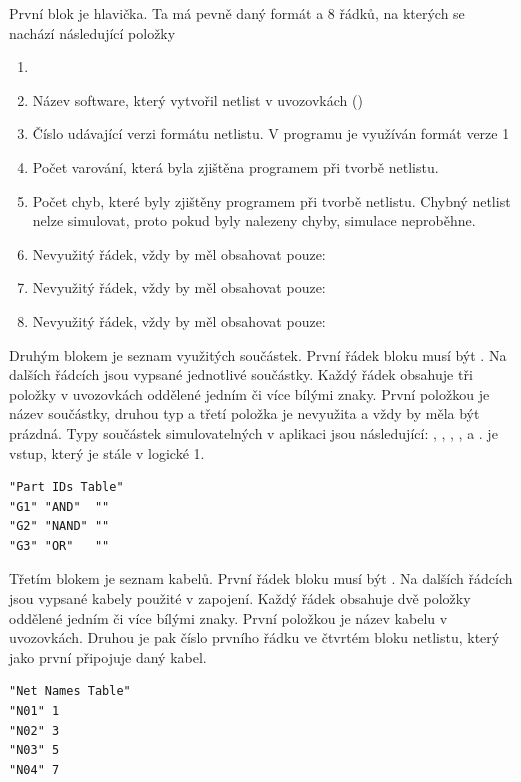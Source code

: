 \documentclass[11pt,a4paper]{article}
\begin{document}
			První blok je hlavička. Ta má pevně daný formát a 8 řádků, na kterých se nachází následující položky

			\begin{enumerate}
				\item {}
				\item Název software, který vytvořil netlist v uvozovkách ()
				\item Číslo udávající verzi formátu netlistu. V programu je využíván formát verze 1
				\item Počet varování, která byla zjištěna programem při tvorbě netlistu.
				\item Počet chyb, které byly zjištěny programem při tvorbě netlistu. Chybný netlist nelze simulovat, proto pokud byly nalezeny chyby, simulace neproběhne.
				\item Nevyužitý řádek, vždy by měl obsahovat pouze: 
				\item Nevyužitý řádek, vždy by měl obsahovat pouze: 
				\item Nevyužitý řádek, vždy by měl obsahovat pouze: 
			\end{enumerate}


			Druhým blokem je seznam využitých součástek. První řádek bloku musí být . Na dalších řádcích jsou vypsané jednotlivé součástky. Každý řádek obsahuje tři položky v uvozovkách oddělené jedním či více bílými znaky. První položkou je název součástky, druhou typ a třetí položka je nevyužita a vždy by měla být prázdná. Typy součástek simulovatelných v aplikaci jsou následující: , , , ,  a \code{INPUT}.  je vstup, který je stále v logické 1.

\begin{lstlisting}[caption=Příklad bloku součástek]
"Part IDs Table"
"G1" "AND"  ""
"G2" "NAND" ""
"G3" "OR"   ""
\end{lstlisting}

			Třetím blokem je seznam kabelů. První řádek bloku musí být . Na dalších řádcích jsou vypsané kabely použité v zapojení. Každý řádek obsahuje dvě položky oddělené jedním či více bílými znaky. První položkou je název kabelu v uvozovkách. Druhou je pak číslo prvního řádku ve čtvrtém bloku netlistu, který jako první připojuje daný kabel.

\begin{lstlisting}[caption=Příklad bloku kabelů]
"Net Names Table"
"N01" 1
"N02" 3
"N03" 5
"N04" 7
\end{lstlisting}
\end{document}
